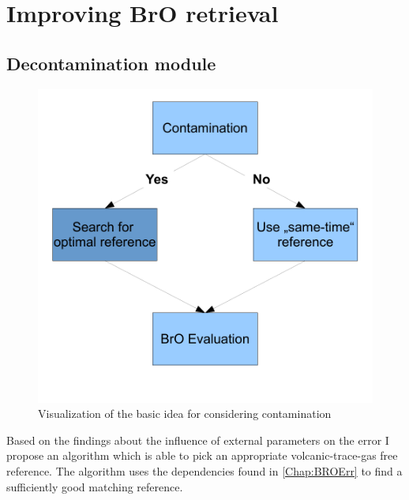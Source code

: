 \documentclass  [
  paper    = a4,
  BCOR     = 10mm,
  twoside,
  fontsize = 12pt,
  fleqn,
  toc      = bibnumbered,
  toc      = listofnumbered,
  numbers  = noendperiod,
  headings = normal,
  listof   = leveldown,
  version  = 3.03
]                                       {scrreprt}
\begin{document}
\part{Improving BrO retrieval}
\chapter{Decontamination module \label{chapt:contbased}}

\begin{figure} 
	\centering
	\includegraphics[width=1\linewidth]{Bilder/smaldiag}
	\caption{Visualization of the basic idea for considering contamination}
	\label{fig:smaldiag}
\end{figure} 
Based on the findings about the influence of external parameters on the  error I propose an algorithm which is able to pick an appropriate volcanic-trace-gas free reference. The algorithm uses the dependencies found in \cref{Chap:BROErr} to find a sufficiently good matching reference.
\end{document}
